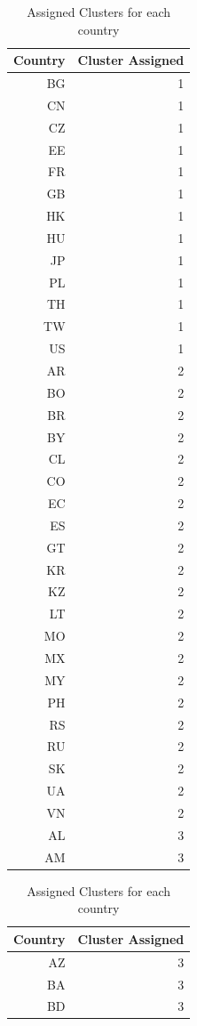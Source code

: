 \documentclass{article}[hidelinks]
\begin{document}
\begin{table}[ht]
\centering
\caption{Assigned Clusters for each country }
\begin{tabular}{rr}
  \hline
 Country & Cluster Assigned \\ 
  \hline
BG &   1 \\ 
  CN &   1 \\ 
  CZ &   1 \\ 
  EE &   1 \\ 
  FR &   1 \\ 
  GB &   1 \\ 
  HK &   1 \\ 
  HU &   1 \\ 
  JP &   1 \\ 
  PL &   1 \\ 
  TH &   1 \\ 
  TW &   1 \\ 
  US &   1 \\ 
  AR &   2 \\ 
  BO &   2 \\ 
  BR &   2 \\ 
  BY &   2 \\ 
  CL &   2 \\ 
  CO &   2 \\ 
  EC &   2 \\ 
  ES &   2 \\ 
  GT &   2 \\ 
  KR &   2 \\ 
  KZ &   2 \\ 
  LT &   2 \\ 
  MO &   2 \\ 
  MX &   2 \\ 
  MY &   2 \\ 
  PH &   2 \\ 
  RS &   2 \\ 
  RU &   2 \\ 
  SK &   2 \\ 
  UA &   2 \\ 
  VN &   2 \\ 
  AL &   3 \\ 
  AM &   3 \\ 
   \hline
\end{tabular}
\begin{tabular}{rr}
  \hline
 Country & Cluster Assigned \\ 
  \hline
     AZ &   3 \\ 
   BA &   3 \\ 
  BD &   3 \\ 

\end{tabular}
\end{table}
\end{document}
